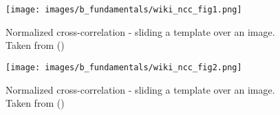     \begin{figure}[h]
        \centering
        \texttt{[image: images/b\_fundamentals/wiki\_ncc\_fig1.png]}
        \caption{Normalized cross-correlation - sliding a template over an image. Taken from (\cite{wiki_ncc})}
        \label{fig:wiki_ncc_fig1}
    \end{figure}

    \begin{figure}[h]
        \centering
        \texttt{[image: images/b\_fundamentals/wiki\_ncc\_fig2.png]}
        \caption{Normalized cross-correlation - sliding a template over an image. Taken from (\cite{wiki_ncc})}
        \label{fig:wiki_ncc_fig2}
    \end{figure}